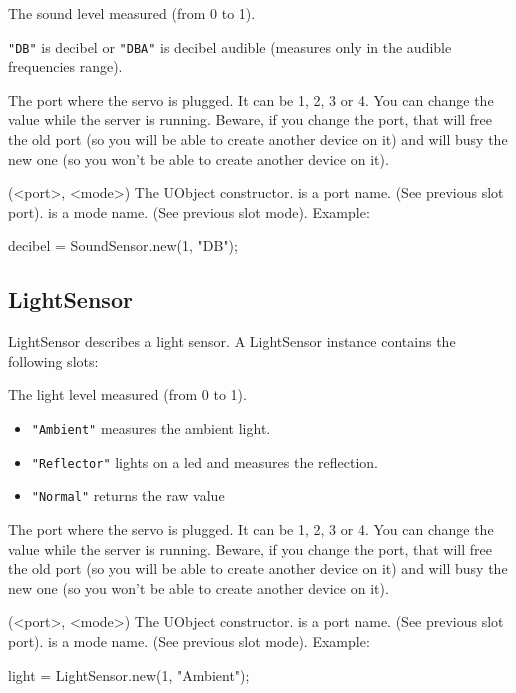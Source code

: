 \begin{urbiscriptapi}

\item[val] The sound level measured (from 0 to 1).

\item[mode] \lstinline{"DB"} is decibel or \lstinline{"DBA"} is decibel
  audible (measures only in the audible frequencies range).

\item[port] The port where the servo is plugged. It can be 1, 2, 3 or 4. You
  can change the value while the server is running. Beware, if you change
  the port, that will free the old port (so you will be able to create
  another device on it) and will busy the new one (so you won't be able to
  create another device on it).


\item[init](<port>, <mode>) The UObject constructor.  is a port
  name. (See previous slot port).  is a mode name. (See
  previous slot mode). Example:
\begin{urbiunchecked}
decibel = SoundSensor.new(1, "DB");
\end{urbiunchecked}

\end{urbiscriptapi}

\subsection{LightSensor}
LightSensor describes a light sensor. A LightSensor instance contains the
following slots:

\begin{urbiscriptapi}
\item[val] The light level measured (from 0 to 1).

\item[mode]
  \begin{itemize}
  \item \lstinline{"Ambient"} measures the ambient light.
  \item \lstinline{"Reflector"} lights on a led and measures the reflection.
  \item \lstinline{"Normal"} returns the raw value
  \end{itemize}

\item[port] The port where the servo is plugged. It can be 1, 2, 3 or 4. You
  can change the value while the server is running. Beware, if you change
  the port, that will free the old port (so you will be able to create
  another device on it) and will busy the new one (so you won't be able to
  create another device on it).

\item[init](<port>, <mode>) The UObject constructor.  is a port
  name. (See previous slot port).  is a mode name. (See previous
  slot mode). Example:
\begin{urbiunchecked}
light = LightSensor.new(1, "Ambient");
\end{urbiunchecked}
\end{urbiscriptapi}

